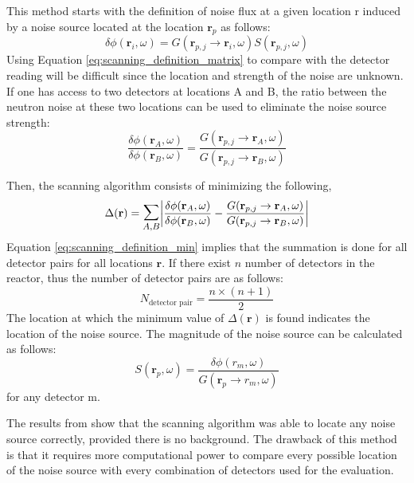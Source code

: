 This method starts with the definition of noise flux at a given location r induced by a noise source located at the location $\textbf{r}_p$ as follows:
\begin{equation}
    \delta \phi (\textbf{r}_i,\omega) = G(\textbf{r}_{p,j} \rightarrow \textbf{r}_i, \omega) S(\textbf{r}_{p,j}, \omega)
    \label{eq:scanning_definition_matrix}
\end{equation}
Using Equation \ref{eq:scanning_definition_matrix} to compare with the detector reading will be difficult since the location and strength of the noise are unknown. If one has access to two detectors at locations A and B, the ratio between the neutron noise at these two locations can be used to eliminate the noise source strength:
\begin{equation}
    \frac{\delta \phi (\textbf{r}_A,\omega)}{\delta \phi (\textbf{r}_B,\omega)} = \frac{G(\textbf{r}_{p,j} \rightarrow \textbf{r}_A, \omega)}{G(\textbf{r}_{p,j} \rightarrow \textbf{r}_B, \omega)}
    \label{eq:scanning_definition_frac}
\end{equation}

Then, the scanning algorithm consists of minimizing the following,
\begin{equation}
    \Delta(\textbf{r}) = \mathlarger{\mathlarger{\sum}}_{A,B} \biggl| \frac{\delta \phi (\textbf{r}_A,\omega)}{\delta \phi (\textbf{r}_B,\omega)} - \frac{G(\textbf{r}_{p,j} \rightarrow \textbf{r}_A, \omega)}{G(\textbf{r}_{p,j} \rightarrow \textbf{r}_B, \omega)} \biggr|
    \label{eq:scanning_definition_min}
\end{equation}
Equation \ref{eq:scanning_definition_min} implies that the summation is done for all detector pairs for all locations $\textbf{r}$. If there exist $n$ number of detectors in the reactor, thus the number of detector pairs are as follows:
\begin{equation}
    N_{\text{detector pair}} = \frac{n \times (n+1)}{2}
\end{equation}
The location at which the minimum value of $\Delta(\textbf{r})$ is found indicates the location of the noise source. The magnitude of the noise source can be calculated as follows:
\begin{equation}
    S(\textbf{r}_p,\omega) = \frac{\delta \phi(r_m,\omega)}{G(\textbf{r}_{p} \rightarrow r_m, \omega)}
\end{equation}
for any detector m.

The results from \cite{demaziereDevelopmentNoisebasedMethod2002} show that the scanning algorithm was able to locate any noise source correctly, provided there is no background. The drawback of this method is that it requires more computational power to compare every possible location of the noise source with every combination of detectors used for the evaluation.

